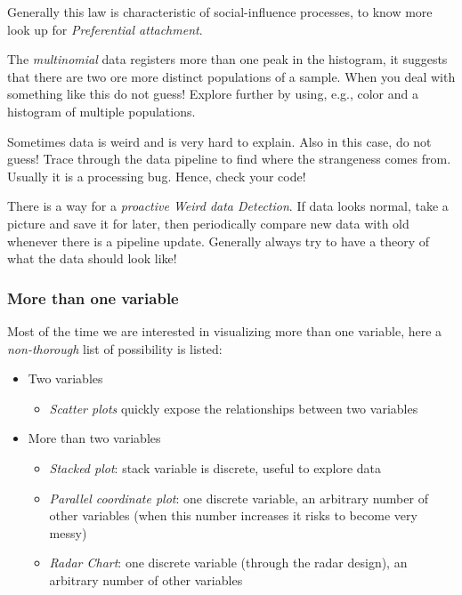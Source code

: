 
Generally this law is characteristic of social-influence processes, to know more look up for \emph{Preferential attachment}.

The \emph{multinomial} data registers more than one peak in the histogram, it suggests that there are two ore more distinct populations of a sample. When you deal with something like this do not guess! Explore further by using, e.g., color and a histogram of multiple populations. 


Sometimes data is weird and is very hard to explain. Also in this case, do not guess! Trace through the data pipeline to find where the strangeness comes from. Usually it is a processing bug. Hence, check your code!

There is a way for a \emph{proactive Weird data Detection}. If data looks normal, take a picture and save it for later, then periodically compare new data with old whenever there is a pipeline update. Generally always try to have a theory of what the data should look like!

\subsubsection{More than one variable}
 
Most of the time we are interested in visualizing more than one variable, here a \emph{non-thorough} list of possibility is listed:

\begin{itemize}
\item Two variables 
\begin{itemize}
\item \emph{Scatter plots} quickly expose the relationships between two variables
\end{itemize} 
\item  More than two variables
\begin{itemize}
\item \emph{Stacked plot}: stack variable is discrete, useful to explore data
\item \emph{Parallel coordinate plot}: one discrete variable, an arbitrary number of other variables (when this number increases it risks to become very messy)
\item \emph{Radar Chart}: one discrete variable (through the radar design), an arbitrary number of other variables
\end{itemize}
\end{itemize}

